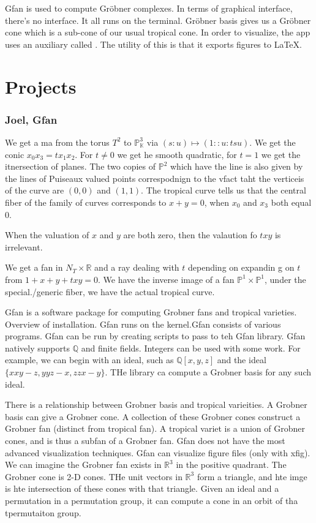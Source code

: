 \documentclass[12pt]{memoir}
\theoremstyle{definition}
\def\QQ{{\mathbb Q}}
\def\RR{{\mathbb R}}
\def\KK{{\mathbb K}}
\def\PP{{\mathbb P}}
\begin{document}
Gfan is used to compute Gr\"obner complexes. In terms of graphical interface, there's no interface. It all runs on the terminal. Gr\"obner basis gives us a Gr\"obner cone which is a sub-cone of our usual tropical cone. In order to visualize, the app uses an auxiliary called . The utility of this is that it exports figures to \LaTeX.

\chapter{Projects}


\subsection{Joel, Gfan }


We get  a ma from the torus $T^2$ to $\PP_\KK^3$ via $(s:u) \mapsto (1::u:tsu)$. We get the conic $x_0x_3=tx_1x_2$. For $t\neq 0$ we get he smooth quadratic, for $t=1$ we get the itnersection of planes.
The two copies of $\PP^2$ which have the line is also given by the lines of Puiseaux valued points correspodnign to the vfact taht the verticeis of the curve are $(0,0)$ and $(1,1)$. The tropical curve tells us that the central fiber of the family of curves corresponds to $x+y=0$, when $x_0$ and $x_3$ both equal $0$.


When the valuation of $x$ and $y$ are both zero, then the valaution fo $txy$ is irrelevant.


We get a fan in $N_T \times \RR$ and a ray dealing with $t$ depending on expandin g on $t$ from $1+x+y+txy=0$. We have the inverse image of a fan $\PP^1 \times \PP^1$, under the special./generic fiber, we have the actual tropical curve.





Gfan is a software package for computing Grobner fans and tropical varieties. Overview of installation. Gfan runs on the kernel.Gfan consists of various programs. Gfan can be run by creating scripts to pass to teh Gfan library. Gfan natively supports $\QQ$ and finite fields. Integers can be used with some work. For example, we can begin with an ideal, such as $\QQ[x,y,z]$ and the ideal $\{xxy-z,yyz-x,zzx-y\}$. THe library ca compute a Grobner basis for any such ideal.

There is a relationship between Grobner basis and tropical varieities. A Grobner basis can give a Grobner cone. A collection of these Grobner cones construct a Grobner fan (distinct from tropical fan). A tropical variet is a union of Grobner cones, and is thus a subfan of a Grobner fan. Gfan does not have the most advanced visualization techniques. Gfan can visualize  figure files (only with xfig). We can imagine the Grobner fan exists in $\RR^3$ in the positive quadrant. The Grobner cone is 2-D cones. THe unit vectors in $\RR^3$ form a triangle, and hte imge is hte intersection of these cones with that triangle. Given an ideal and a permutation in a permutation group, it can compute a cone in an orbit of tha tpermutaiton group.
\end{document}
